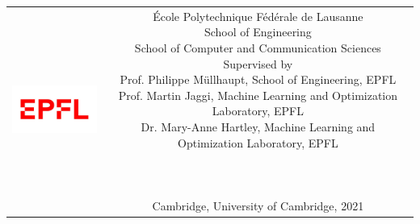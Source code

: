 \begin{titlepage}
\begin{center}
\begin{tabular} {cc}
\parbox{0.3\textwidth}{\includegraphics[width=4cm]{images/logoepfl} \vspace{4.1cm}}
&
\parbox{0.7\textwidth}{%
École Polytechnique Fédérale de Lausanne \\
  School of Engineering\\
  School of Computer and Communication Sciences\\[6pt]
%
Supervised by\\[4pt]
%
    Prof. Philippe Müllhaupt, School of Engineering, EPFL\\
    Prof. Martin Jaggi, Machine Learning and Optimization Laboratory, EPFL\\
    Dr. Mary-Anne Hartley, Machine Learning and Optimization Laboratory, EPFL \\\\\\\\ [12pt]
%
Cambridge, University of Cambridge, 2021}

\end{tabular}
\end{center}

\end{titlepage}



